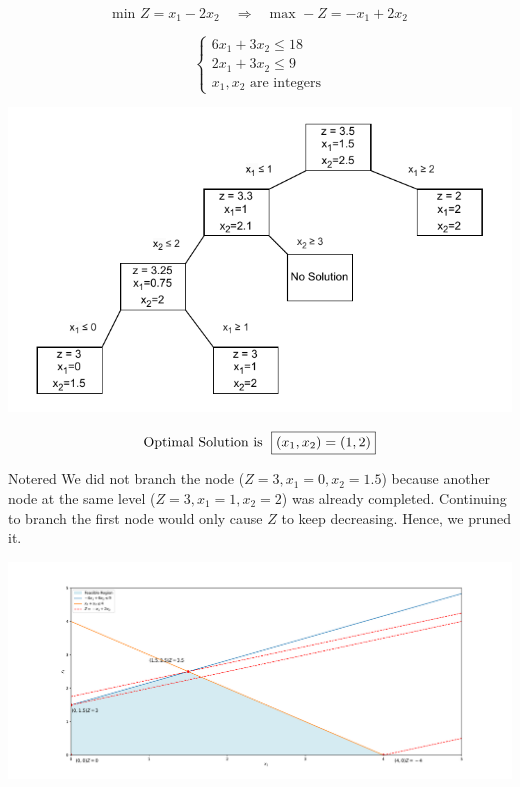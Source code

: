 \newpage
\[ \text{min } Z = x_1 - 2x_2 \quad \Longrightarrow \quad \text{max } -Z = - x_1 + 2x_2 \]  

\[    
\left\{
    \begin{array}{l}
        6x_{1} + 3x_{2} \leq 18 \\[2pt]
        2x_{1} + 3x_{2} \leq 9 \\[2pt]
        x_{1}, x_{2} \text{ are integers}
    \end{array}
    \right.
\]

\begin{center}
    \includegraphics{Exercice/PY/EX2/b2.drawio.pdf}
\end{center}

\vspace{0.5cm}

\[\text{Optimal Solution is }\hspace{0.1cm} \boxed{(x_1,x_2) = (1,2)}\]


\vspace{0.5cm}

\begin{prettyBox}{Note}{red}
We did not branch the node (\(Z = 3, x_1 = 0, x_2 = 1.5\)) because another node 
at the same level (\(Z = 3, x_1 = 1, x_2 = 2\)) was already completed. Continuing 
to branch the first node would only cause \(Z\) to keep decreasing. Hence, we pruned it.
\end{prettyBox}

\begin{center}
    \includegraphics[width = \textwidth]{Exercice/PY/EX2/ex2.1.pdf}
\end{center}


